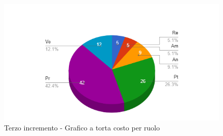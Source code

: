 {{\begin{longtable}{C{.4\freewidth} C{.2\freewidth} C{.2\freewidth} C{.2\freewidth} C{.2\freewidth} C{.2\freewidth} C{.2\freewidth} C{.2\freewidth} C{.2\freewidth}}
        \end{longtable}
        \begin{figure}[H]
          \includegraphics[width=15cm]{sezioni/Images/terzoT.png}
          \centering
          \caption{Terzo incremento - Grafico a torta costo per ruolo}
       \end{figure}
    }
    }

